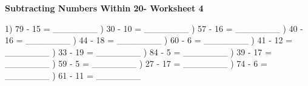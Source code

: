 \documentclass{article}%
\begin{document}
\begin{center}%
\textbf{Subtracting Numbers Within 20- Worksheet 4}%
\newline%
\end{center} \normalsize%
1) 79 {-} 15 = \_\_\_\_\_\_\_%
\newline%
\newline%
) 30 {-} 10 = \_\_\_\_\_\_\_%
\newline%
\newline%
) 57 {-} 16 = \_\_\_\_\_\_\_%
\newline%
\newline%
) 40 {-} 16 = \_\_\_\_\_\_\_%
\newline%
\newline%
) 44 {-} 18 = \_\_\_\_\_\_\_%
\newline%
\newline%
) 60 {-} 6 = \_\_\_\_\_\_\_%
\newline%
\newline%
) 41 {-} 12 = \_\_\_\_\_\_\_%
\newline%
\newline%
) 33 {-} 19 = \_\_\_\_\_\_\_%
\newline%
\newline%
) 84 {-} 5 = \_\_\_\_\_\_\_%
\newline%
\newline%
) 39 {-} 17 = \_\_\_\_\_\_\_%
\newline%
\newline%
) 59 {-} 5 = \_\_\_\_\_\_\_%
\newline%
\newline%
) 27 {-} 17 = \_\_\_\_\_\_\_%
\newline%
\newline%
) 74 {-} 6 = \_\_\_\_\_\_\_%
\newline%
\newline%
) 61 {-} 11 = \_\_\_\_\_\_\_%
\end{document}
